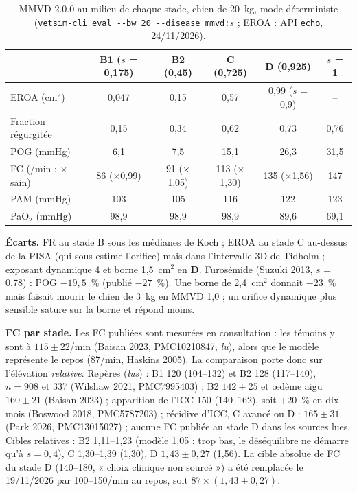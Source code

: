 \documentclass[10pt,a4paper]{article}
\newcommand{\cmd}[1]{\texttt{#1}}
\newcommand{\evD}{\textcolor{red!70!black}{\textbf{D}}}
\newcommand{\acc}[1]{\textsl{#1}}
\begin{document}
\begin{table}[h]\centering\small
\caption{MMVD 2.0.0 au milieu de chaque stade, chien de 20~kg, mode déterministe (\cmd{vetsim-cli eval -{}-bw 20 -{}-disease mmvd:$s$} ; EROA : API \cmd{echo}, 24/11/2026).}\label{tab:mmvd}
\begin{tabular}{@{}lccccc@{}}
\toprule
& B1 ($s$ = 0,175) & B2 (0,45) & C (0,725) & D (0,925) & $s$ = 1\\
\midrule
EROA (cm$^2$) & 0,047 & 0,15 & 0,57 & 0,99 ($s$ = 0,9) & --\\
Fraction régurgitée & 0,15 & 0,34 & 0,62 & 0,73 & 0,76\\
POG (mmHg) & 6,1 & 7,5 & 15,1 & 26,3 & 31,5\\
FC (/min ; $\times$ sain) & 86 ($\times$0,99) & 91 ($\times$1,05) & 113 ($\times$1,30) & 135 ($\times$1,56) & 147\\
PAM (mmHg) & 103 & 105 & 116 & 122 & 123\\
PaO$_2$ (mmHg) & 98,9 & 98,9 & 98,9 & 89,6 & 69,1\\
\bottomrule
\end{tabular}
\end{table}

\textbf{Écarts.} FR au stade B sous les médianes de Koch ; EROA au stade C au-dessus de la PISA (qui sous-estime l'orifice) mais dans l'intervalle 3D de Tidholm ; exposant dynamique 4 et borne 1,5~cm$^2$ en \evD{}. Furosémide (Suzuki 2013, $s$ = 0,78) : POG $-19{,}5$~\% (publié $-27$~\%). Une borne de 2,4~cm$^2$ donnait $-23$~\% mais faisait mourir le chien de 3~kg en MMVD 1,0 ; un orifice dynamique plus sensible sature sur la borne et répond moins.

\textbf{FC par stade.} Les FC publiées sont mesurées en consultation : les témoins y sont à $115 \pm 22$/min (Baisan 2023, PMC10210847, \acc{lu}), alors que le modèle représente le repos (87/min, Haskins 2005). La comparaison porte donc sur l'élévation \emph{relative}. Repères (\acc{lus}) : B1 120 (104--132) et B2 128 (117--140), $n = 908$ et 337 (Wilshaw 2021, PMC7995403) ; B2 $142 \pm 25$ et œdème aigu $160 \pm 21$ (Baisan 2023) ; apparition de l'ICC 150 (140--162), soit $+20$~\% en dix mois (Boswood 2018, PMC5787203) ; récidive d'ICC, C avancé ou D : $165 \pm 31$ (Park 2026, PMC13015027) ; aucune FC publiée au stade D dans les sources lues. Cibles relatives : B2 1,11--1,23 (modèle 1,05 : trop bas, le déséquilibre ne démarre qu'à $s = 0{,}4$), C 1,30--1,39 (1,30), D $1{,}43 \pm 0{,}27$ (1,56). La cible absolue de FC du stade D (140--180, « choix clinique non sourcé ») a été remplacée le 19/11/2026 par 100--150/min au repos, soit $87 \times (1{,}43 \pm 0{,}27)$.
\end{document}
